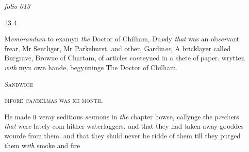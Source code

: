 \documentclass[12pt, a4paper]{book}
\begin{document}
\textit{folio 013}


\begin{flushright}{\color{Mahogany}13} 4\end{flushright}
 

	
		\ifthenelse{\isodd{\thepage}}
		{\reversemarginpar}
		{\normalmarginpar}
		M\textit{emorandum} to examyn \textit{the} Doctor of Chilham, Du\textit{n}dy \textit{that} was an
		ob\textit{ser}vant frear, Mr Sentliger, Mr Parkehurst, and other, Gardin\textit{er},
 A bricklayer called Burgrave, Browne of Chartam, of
 articles co\textit{n}teyned in a shete of paper. wrytten \textit{with} myn own hande, begy\textit{n}ninge
		The Doctor of Chilham.
			

				\marginpar[\vspace{0.5cm}{\textcolor{Gray}{n}}]{}
			

            
            	
				\begin{center} \begin{large} {\scshape Sandwich} \end{large} \end{center}
			
               
                  
				\begin{center}  {\scshape 
                     bifore ca\textit{n}delmas was xii month.
                  }  \end{center}
			

               	
				\marginpar[\vspace{0.5cm}{\textcolor{Gray}{sclaunderous}}]{}
			
				\marginpar[\vspace{0.5cm}{\textcolor{Gray}{n}}]{}
			
		\ifthenelse{\isodd{\thepage}}
		{\reversemarginpar}
		{\normalmarginpar}
		 He made ii veray seditious \textit{ser}mons in \textit{the} chapter howse, callynge
 the p\textit{re}chers \textit{that} were lately com hither waterlaggers. and that they
 had taken away gooddes wourde from them. and that they shuld never be
 ridde of them till they purged them w\textit{ith} smoke and fire
 
				\marginpar[\vspace{0.5cm}{\textcolor{Gray}{sclaunderous}}]{}
			
\end{document}

